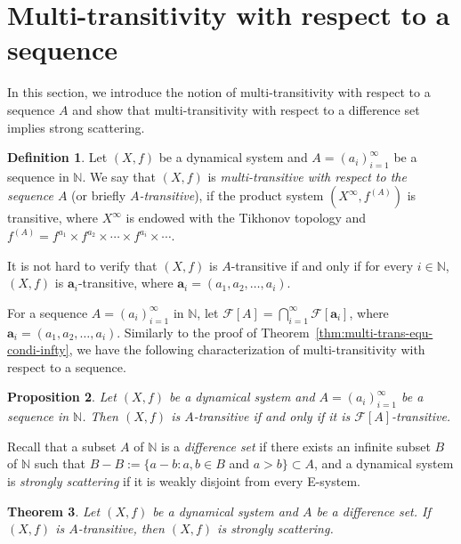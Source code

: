 \documentclass[12pt,a4paper]{amsart}
\newtheorem{thm}{Theorem}[section]
\newtheorem{prop}[thm]{Proposition}
\theoremstyle{definition}
\newtheorem{de}[thm]{Definition}
\numberwithin{equation}{section}
\begin{document}
\section{Multi-transitivity with respect to a sequence}
In this section, we introduce the notion of multi-transitivity with respect to a sequence $A$
and show that multi-transitivity with respect to a difference set implies strong scattering.

\begin{de}
Let $(X, f)$ be a dynamical system and $A=(a_i)_{i=1}^\infty$ be a sequence in $\mathbb{N}$.
We say that $(X,f)$ is \emph{multi-transitive with respect to the sequence $A$} (or briefly \emph{$A$-transitive}),
if the product system $(X^\infty, f^{(A)})$ is transitive,
where  $X^\infty$ is endowed with the Tikhonov topology
and $f^{(A)}=f^{a_{1}}\times f^{a_{2}}\times \dotsb \times f^{a_{i}}\times\dotsb$.

It is not hard to verify that $(X,f)$ is $A$-transitive if and only if for every $i\in\mathbb{N}$,
$(X,f)$ is $\mathbf{a}_i$-transitive, where $\mathbf{a}_i=(a_1,a_2,\dotsc,a_i)$.
\end{de}

For a sequence $A=(a_i)_{i=1}^\infty$ in $\mathbb{N}$,
let $\mathcal{F}[A]=\bigcap_{i=1}^\infty \mathcal{F}[\mathbf{a}_i]$, where $\mathbf{a}_i=(a_1,a_2,\dotsc,a_i)$.
Similarly to the proof of Theorem~\ref{thm:multi-trans-equ-condi-infty},
we have the following characterization of multi-transitivity with respect to a sequence.

\begin{prop}
Let $(X,f)$ be a dynamical system and $A=(a_i)_{i=1}^\infty$ be a sequence in $\mathbb{N}$.
Then $(X,f)$ is $A$-transitive if and only if it is $\mathcal{F}[A]$-transitive.
\end{prop}

Recall that a subset $A$ of $\mathbb{N}$ is a \emph{difference set} if
there exists an infinite subset $B$ of $\mathbb{N}$
such that $B-B:=\{a-b: a,b\in B $ and $a>b\}\subset A$, and a dynamical system is \emph{strongly scattering} if
it is weakly disjoint from every E-system.

\begin{thm}\label{thm:diff-set-tran-impl-s-scatter}
Let $(X, f)$ be a dynamical system and $A$ be a difference set.
If $(X,f)$ is $A$-transitive, then $(X,f)$ is strongly scattering.
\end{thm}
\end{document}
